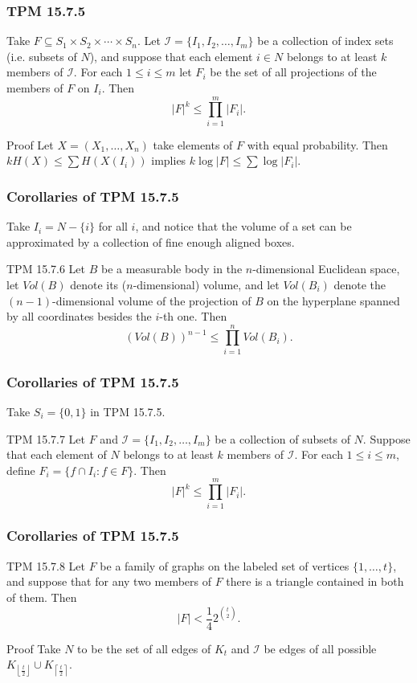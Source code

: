 \documentclass{beamer}
\newcommand{\lf}{\left\lfloor}
\newcommand{\rf}{\right\rfloor}
\newcommand{\lc}{\left\lceil}
\newcommand{\rc}{\right\rceil}
\begin{document}
\begin{frame}
  \frametitle{TPM 15.7.5}
  Take $F \subseteq S_1 \times S_2 \times \dotsb \times S_n$. Let $\mathcal{I} = \{ I_1, I_2, \dotsc, I_m \}$ be a collection of index sets (i.e. subsets of $N$), and suppose that each element $i \in N$ belongs to at least $k$ members of $\mathcal{I}$. For each $1 \le i \le m$ let $F_i$ be the set of all projections of the members of $F$ on $I_i$. Then \[ |F|^k \le \prod_{i = 1}^m |F_i|. \] \pause

  \begin{block}{Proof}
    Let $X = (X_1, \dotsc, X_n)$ take elements of $F$ with equal probability. Then $kH(X) \le \sum H(X(I_i))$ implies $k \log |F| \le \sum \log |F_i|$.
  \end{block}
\end{frame}

\begin{frame}
  \frametitle{Corollaries of TPM 15.7.5}
  Take $I_i = N - \{ i \}$ for all $i$, and notice that the volume of a set can be approximated by a collection of fine enough aligned boxes.
  \begin{block}{TPM 15.7.6}
    Let $B$ be a measurable body in the $n$-dimensional Euclidean space, let $Vol(B)$ denote its ($n$-dimensional) volume, and let $Vol(B_i)$ denote the $(n - 1)$-dimensional volume of the projection of $B$ on the hyperplane spanned by all coordinates besides the $i$-th one. Then \[ (Vol(B))^{n - 1} \le \prod_{i = 1}^n Vol(B_i). \]
  \end{block}
\end{frame}

\begin{frame}
  \frametitle{Corollaries of TPM 15.7.5}
  Take $S_i = \{ 0, 1 \}$ in TPM 15.7.5.
  \begin{block}{TPM 15.7.7}
    Let $F$ and $\mathcal{I} = \{ I_1, I_2, \dotsc, I_m \}$ be a collection of subsets of $N$. Suppose that each element of $N$ belongs to at least $k$ members of $\mathcal{I}$. For each $1 \le i \le m$, define $F_i = \{ f \cap I_i : f \in F \}.$ Then \[ |F|^k \le \prod_{i = 1}^m |F_i|. \]
  \end{block}
\end{frame}

\begin{frame}
  \frametitle{Corollaries of TPM 15.7.5}
  \begin{block}{TPM 15.7.8}
    Let $F$ be a family of graphs on the labeled set of vertices $\{ 1, \dotsc, t \}$, and suppose that for any two members of $F$ there is a triangle contained in both of them. Then \[ |F| < \frac{1}{4} 2^{\binom{t}{2}}. \]
  \end{block} \pause

  \begin{block}{Proof}
    Take $N$ to be the set of all edges of $K_t$ and $\mathcal{I}$ be edges of all possible $K_{\lf \frac{t}{2} \rf} \cup K_{\lc \frac{t}{2} \rc}$.
  \end{block}
\end{frame}
\end{document}
